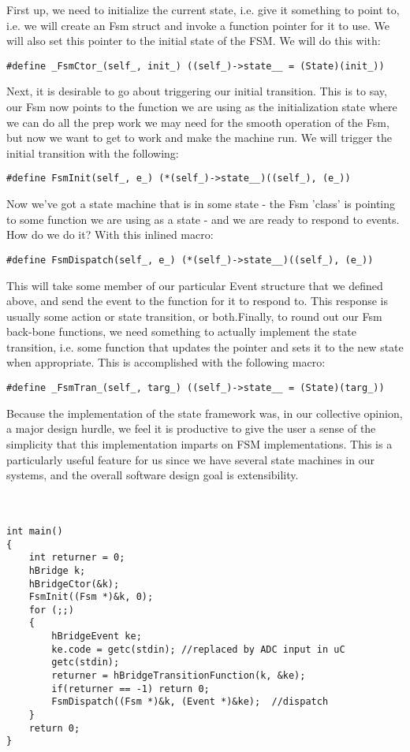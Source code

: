 First up, we need to initialize the current state, i.e. give it something to point to, i.e. we will create an Fsm struct and invoke a function pointer for it to use. We will also set this pointer to the initial state of the FSM. We will do this with:

\begin{lstlisting}
#define _FsmCtor_(self_, init_) ((self_)->state__ = (State)(init_))
\end{lstlisting}

Next, it is desirable to go about triggering our initial transition. This is to say, our Fsm now points to the function we are using as the initialization state where we can do all the prep work we may need for the smooth operation of the Fsm, but now we want to get to work and make the machine run. We will trigger the initial transition with the following:

\begin{lstlisting}
#define FsmInit(self_, e_) (*(self_)->state__)((self_), (e_))
\end{lstlisting}

Now we've got a state machine that is in some state - the Fsm 'class' is pointing to some function we are using as a state - and we are ready to respond to events. How do we do it? With this inlined macro:

\begin{lstlisting}
#define FsmDispatch(self_, e_) (*(self_)->state__)((self_), (e_))
\end{lstlisting}


This will take some member of our particular Event structure that we defined above, and send the event to the function for it to respond to. This response is usually some action or state transition, or both.Finally, to round out our Fsm back-bone functions, we need something to actually implement the state transition, i.e. some function that updates the pointer and sets it to the new state when appropriate. This is accomplished with the following macro:
\begin{lstlisting}
#define _FsmTran_(self_, targ_) ((self_)->state__ = (State)(targ_))
\end{lstlisting}
Because the implementation of the state framework was, in our collective opinion, a major design hurdle, we feel it is productive to give the user a sense of the simplicity that this implementation imparts on FSM implementations. This is a particularly useful feature for us since we have several state machines in our systems, and the overall software design goal is extensibility.  
\\
\\
\\
\begin{lstlisting}
int main()
{
    int returner = 0;
    hBridge k;
    hBridgeCtor(&k);
    FsmInit((Fsm *)&k, 0);
    for (;;)
    {
        hBridgeEvent ke;                   
        ke.code = getc(stdin); //replaced by ADC input in uC           
        getc(stdin);                      
        returner = hBridgeTransitionFunction(k, &ke);
        if(returner == -1) return 0;
        FsmDispatch((Fsm *)&k, (Event *)&ke);  //dispatch
    }
    return 0;
}
\end{lstlisting}
\hfill \break
\hfill \break
 
